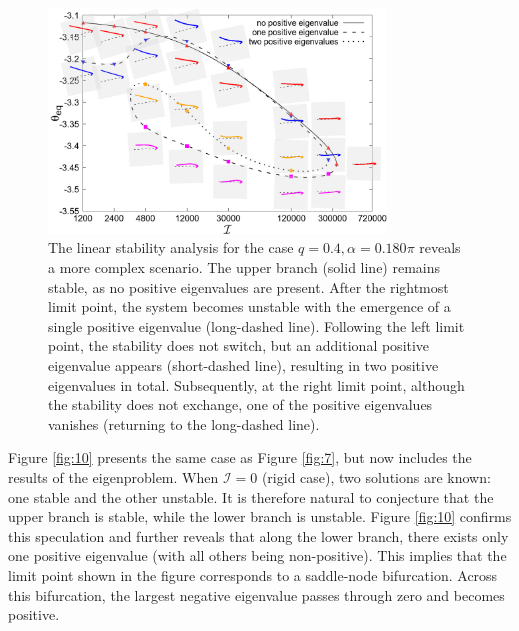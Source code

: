 \documentclass[lineno]{JFM-FLM_Au}
\begin{document}
\begin{figure}[!h]
	\begin{center}
		\includegraphics[width=0.8\textwidth]{plot/RESLT_q_0.40_alpha_0.180pi_plot_step_refine2_new_recale_FSI/combine_elastic_beam_I_theta_q_0.400_alpha_0.180pi_initial_-4.80_refine2_new_dash_line.png}
		\caption{The linear stability analysis for the case $q=0.4,\alpha=0.180\pi$ reveals a more complex scenario. The upper branch (solid line) remains stable, as no positive eigenvalues are present. After the rightmost limit point, the system becomes unstable with the emergence of a single positive eigenvalue (long-dashed line). Following the left limit point, the stability does not switch, but an additional positive eigenvalue appears (short-dashed line), resulting in two positive eigenvalues in total. Subsequently, at the right limit point, although the stability does not exchange, one of the positive eigenvalues vanishes (returning to the long-dashed line).}
		\label{fig:11}
	\end{center}
\end{figure}
Figure \ref{fig:10} presents the same case as Figure \ref{fig:7}, but now includes the results of the eigenproblem. When $\mathcal{I} = 0$ (rigid case), two solutions are known: one stable and the other unstable. It is therefore natural to conjecture that the upper branch is stable, while the lower branch is unstable. Figure \ref{fig:10} confirms this speculation and further reveals that along the lower branch, there exists only one positive eigenvalue (with all others being non-positive). This implies that the limit point shown in the figure corresponds to a saddle-node bifurcation. Across this bifurcation, the largest negative eigenvalue passes through zero and becomes positive.
\end{document}
